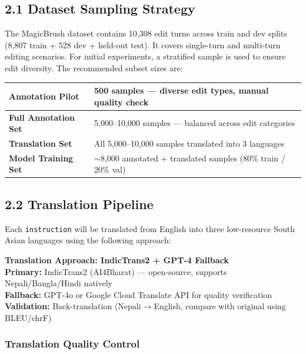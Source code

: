 \documentclass[11pt,a4paper]{article}
\begin{document}
\subsection{2.1 Dataset Sampling Strategy}

The MagicBrush dataset contains 10,308 edit turns across train and dev splits (8,807 train + 528 dev + held-out test). It covers single-turn and multi-turn editing scenarios. For initial experiments, a stratified sample is used to ensure edit diversity. The recommended subset sizes are:

\vspace{6pt}
\begin{tabularx}{\textwidth}{>{\bfseries}lX}
\toprule
Annotation Pilot & 500 samples — diverse edit types, manual quality check \\
\midrule
Full Annotation Set & 5,000–10,000 samples — balanced across edit categories \\
\midrule
Translation Set & All 5,000–10,000 samples translated into 3 languages \\
\midrule
Model Training Set & $\sim$8,000 annotated + translated samples (80\% train / 20\% val) \\
\bottomrule
\end{tabularx}

\subsection{2.2 Translation Pipeline}

Each \texttt{instruction} will be translated from English into three low-resource South Asian languages using the following approach:

\begin{infobox}
\textbf{Translation Approach: IndicTrans2 + GPT-4 Fallback}\\[4pt]
\textbf{Primary:} IndicTrans2 (AI4Bharat) — open-source, supports Nepali/Bangla/Hindi natively\\
\textbf{Fallback:} GPT-4o or Google Cloud Translate API for quality verification\\
\textbf{Validation:} Back-translation (Nepali$\to$English, compare with original using BLEU/chrF)
\end{infobox}

\subsubsection*{Translation Quality Control}
\end{document}
